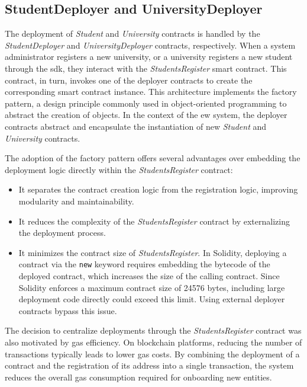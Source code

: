 \subsection{StudentDeployer and UniversityDeployer}
The deployment of \textit{Student} and \textit{University} contracts is handled by the \textit{StudentDeployer} and \textit{UniversityDeployer} contracts, respectively. When a system administrator registers a new university, or a university registers a new student through the \acrshort{sdk}, they interact with the \textit{StudentsRegister} smart contract. This contract, in turn, invokes one of the deployer contracts to create the corresponding smart contract instance. This architecture implements the factory pattern, a design principle commonly used in object-oriented programming to abstract the creation of objects. In the context of the \acrshort{ew} system, the deployer contracts abstract and encapsulate the instantiation of new \textit{Student} and \textit{University} contracts.

The adoption of the factory pattern offers several advantages over embedding the deployment logic directly within the \textit{StudentsRegister} contract:

\begin{itemize}
    \item It separates the contract creation logic from the registration logic, improving modularity and maintainability.
    \item It reduces the complexity of the \textit{StudentsRegister} contract by externalizing the deployment process.
    \item It minimizes the contract size of \textit{StudentsRegister}. In Solidity, deploying a contract via the \texttt{new} keyword requires embedding the bytecode of the deployed contract, which increases the size of the calling contract. Since Solidity enforces a maximum contract size of 24576 bytes, including large deployment code directly could exceed this limit. Using external deployer contracts bypass this issue.
\end{itemize}

The decision to centralize deployments through the \textit{StudentsRegister} contract was also motivated by gas efficiency. On blockchain platforms, reducing the number of transactions typically leads to lower gas costs. By combining the deployment of a contract and the registration of its address into a single transaction, the system reduces the overall gas consumption required for onboarding new entities.

